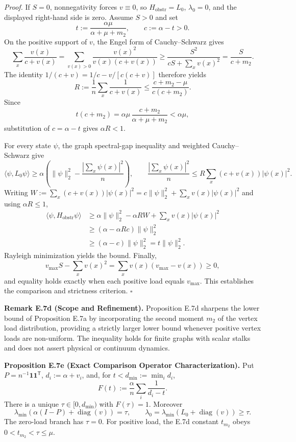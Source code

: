 \documentclass[
]{article}
\begin{document}
\emph{Proof.} If \(S=0\), nonnegativity forces \(v\equiv0\), so
\(H_{\mathrm{obstr}}=L_0\), \(\lambda_0=0\), and the displayed right-hand side is
zero. Assume \(S>0\) and set
\[t:=\frac{\alpha\mu}{\alpha+\mu+m_2},\qquad c:=\alpha-t>0.\]
On the positive support of \(v\), the Engel form of Cauchy--Schwarz gives
\[\sum_x\frac{v(x)}{c+v(x)}
=\sum_{v(x)>0}\frac{v(x)^2}{v(x)(c+v(x))}
\ge\frac{S^2}{cS+\sum_xv(x)^2}
=\frac{S}{c+m_2}.\]
The identity \(1/(c+v)=1/c-v/[c(c+v)]\) therefore yields
\[R:=\frac1n\sum_x\frac1{c+v(x)}
\le\frac{c+m_2-\mu}{c(c+m_2)}.\]
Since
\[t(c+m_2)
=\alpha\mu\,\frac{c+m_2}{\alpha+\mu+m_2}<\alpha\mu,\]
substitution of \(c=\alpha-t\) gives \(\alpha R<1\).

For every state \(\psi\), the graph spectral-gap inequality and weighted
Cauchy--Schwarz give
\[\langle\psi,L_0\psi\rangle
\ge\alpha\left(\|\psi\|_2^2-\frac{|\sum_x\psi(x)|^2}{n}\right),\qquad
\frac{|\sum_x\psi(x)|^2}{n}
\le R\sum_x(c+v(x))|\psi(x)|^2.\]
Writing \(W:=\sum_x(c+v(x))|\psi(x)|^2
=c\|\psi\|_2^2+\sum_xv(x)|\psi(x)|^2\) and using \(\alpha R\le1\),
\[\begin{aligned}
\langle\psi,H_{\mathrm{obstr}}\psi\rangle
&\ge\alpha\|\psi\|_2^2-\alpha RW+\sum_xv(x)|\psi(x)|^2\\
&\ge(\alpha-\alpha Rc)\|\psi\|_2^2\\
&\ge(\alpha-c)\|\psi\|_2^2=t\|\psi\|_2^2.
\end{aligned}\]
Rayleigh minimization yields the bound. Finally,
\[v_{\max}S-\sum_xv(x)^2=\sum_xv(x)(v_{\max}-v(x))\ge0,\]
and equality holds exactly when each positive load equals \(v_{\max}\).
This establishes the comparison and strictness criterion. \(\square\)

\textbf{Remark E.7d (Scope and Refinement).} Proposition E.7d sharpens the lower bound of Proposition E.7a by incorporating the second moment \(m_2\) of the vertex load distribution, providing a strictly larger lower bound whenever positive vertex loads are non-uniform. The inequality holds for finite graphs with scalar stalks and does not assert physical or continuum dynamics.

\textbf{Proposition E.7e (Exact Comparison Operator Characterization).} Put \(P=n^{-1}\mathbf1\mathbf1^{\mathsf T}\),
\(d_i:=\alpha+v_i\), and, for \(t<d_{\min}:=\min_i d_i\),
\[F(t):=\frac{\alpha}{n}\sum_i\frac1{d_i-t}.\]
There is a unique \(\tau\in[0,d_{\min})\) with \(F(\tau)=1\). Moreover
\[\lambda_{\min}\!\left(\alpha(I-P)+\operatorname{diag}(v)\right)=\tau,
\qquad
\lambda_0=\lambda_{\min}(L_0+\operatorname{diag}(v))\ge\tau.\]
The zero-load branch has \(\tau=0\). For positive load, the E.7d constant
\(t_{m_2}\) obeys \(0<t_{m_2}<\tau\le\mu\).
\end{document}
